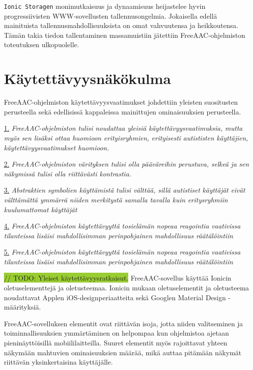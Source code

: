 \documentclass[utf8]{gradu3}
\begin{document}
\texttt{Ionic Storagen} monimutkaisuus ja dynaamisuus heijastelee hyvin progressiivisten WWW-sovellusten tallennusongelmia. Jokaisella edellä mainituista tallennusmahdollisuuksista on omat vahvuutensa ja heikkoutensa. Tämän takia tiedon tallentaminen massamuistiin jätettiin FreeAAC-ohjelmiston toteutuksen ulkopuolelle.

\section{Käytettävyysnäkökulma}

FreeAAC-ohjelmiston käytettävyysvaatimukset johdettiin yleisten suositusten perusteella sekä edellisissä kappaleissa mainittujen ominaisuuksien perusteella.

\hyperref[general-usability-requirements]{1.} \textit{FreeAAC-ohjelmiston tulisi noudattaa yleisiä käytettävyysvaatimuksia, mutta myös sen lisäksi ottaa huomioon erityisryhmien, erityisesti autististen käyttäjien, käytettävyysvaatimukset huomioon.}

\hyperref[AAC-colors]{2.} \textit{FreeAAC-ohjelmiston värityksen tulisi olla pääväreihin perustuva, selkeä ja sen näkymissä tulisi olla riittävästi kontrastia. }

\hyperref[AAC-abstract-symbols]{3.} \textit{Abstraktien symbolien käyttämistä tulisi välttää, sillä autistiset käyttäjät eivät välttämättä ymmärrä niiden merkitystä samalla tavalla kuin eritysryhmiin kuulumattomat käyttäjät}

\hyperref[AAC-context-settings]{4.} \textit{FreeAAC-ohjelmiston käytettävyyttä tosielämän nopeaa reagointia vaativissa tilanteissa lisäisi mahdollisimman perinpohjainen mahdollisuus räätälöintiin}

\hyperref[AAC-staticity]{5.} \textit{FreeAAC-ohjelmiston käytettävyyttä tosielämän nopeaa reagointia vaativissa tilanteissa lisäisi mahdollisimman perinpohjainen mahdollisuus räätälöintiin}

\colorbox{YellowGreen}{// TODO: Yleiset käytettävyysratkaisut.}
FreeAAC-sovellus käyttää Ionicin oletuselementtejä ja oletusteemaa. Ionicin mukaan oletuselementit ja oletusteema noudattavat Applen iOS-designperiaatteita sekä Googlen Material Design -määrityksiä.  

FreeAAC-sovelluksen elementit ovat riittävän isoja, jotta niiden valitseminen ja toiminnallisuuksien ymmärtäminen on helpompaa kun ohjelmistoa ajetaan pieninäyttöisillä mobiililaitteilla. Suuret elementit myös rajoittavat yhteen näkymään mahtuvien ominaisuuksien määrää, mikä auttaa pitämään näkymät riittävän yksinkertaisina käyttäjälle.
\end{document}
